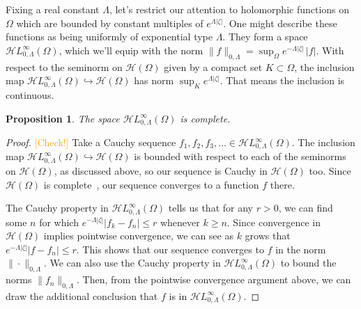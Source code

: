 \documentclass{article}
\theoremstyle{plain}
\newtheorem{prop}{Proposition}
\newcommand{\holo}{\mathcal{H}}
\newcommand{\singexp}[2]{\mathcal{H}L^\infty_{#1, #2}}
\begin{document}
Fixing a real constant $\Lambda$, let's restrict our attention to holomorphic functions on $\Omega$ which are bounded by constant multiples of $e^{\Lambda|\zeta|}$. One might describe these functions as being uniformly of exponential type $\Lambda$. They form a space $\singexp{0}{\Lambda}(\Omega)$, which we'll equip with the norm $\|f\|_{0,\Lambda} = \sup_\Omega e^{-\Lambda|\zeta|}\,|f|$. With respect to the seminorm on $\holo(\Omega)$ given by a compact set $K \subset \Omega$, the inclusion map $\singexp{0}{\Lambda}(\Omega) \hookrightarrow \holo(\Omega)$ has norm $\sup_K e^{\Lambda |\zeta|}$. That means the inclusion is continuous.
\begin{prop}\label{exp-complete}
The space $\singexp{0}{\Lambda}(\Omega)$ is complete.
\end{prop}
\begin{proof}
\textcolor{orange}{[Check!]} Take a Cauchy sequence $f_1, f_2, f_3, \ldots \in \singexp{0}{\Lambda}(\Omega)$. The inclusion map $\singexp{0}{\Lambda}(\Omega) \hookrightarrow \holo(\Omega)$ is bounded with respect to each of the seminorms on $\holo(\Omega)$, as discussed above, so our sequence is Cauchy in $\holo(\Omega)$ too. Since $\holo(\Omega)$ is complete~\cite[Proposition~3.5]{fnl-cpx-anal}, our sequence converges to a function $f$ there.

The Cauchy property in $\singexp{0}{\Lambda}(\Omega)$ tells us that for any $r > 0$, we can find some $n$ for which $e^{-\Lambda |\zeta|} |f_k - f_n| \le r$ whenever $k \ge n$. Since convergence in $\holo(\Omega)$ implies pointwise convergence, we can see as $k$ grows that $e^{-\Lambda |\zeta|} |f - f_n| \le r$. This shows that our sequence converges to $f$ in the norm $\|\cdot\|_{0,\Lambda}$. We can also use the Cauchy property in $\singexp{0}{\Lambda}(\Omega)$ to bound the norms $\|f_n\|_{0,\Lambda}$. Then, from the pointwise convergence argument above, we can draw the additional conclusion that $f$ is in $\singexp{0}{\Lambda}(\Omega)$.
\end{proof}
\end{document}
